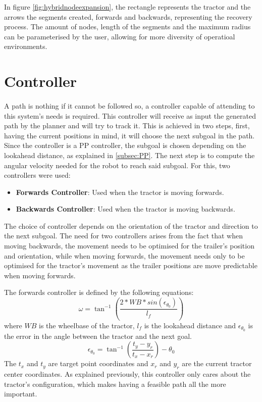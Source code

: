 In figure \ref{fig:hybridnodeexpansion}, the rectangle represents the tractor and the 
arrows the segments created, forwards and backwards, representing the recovery process. 
The amount of nodes, length of the segments and the maximum radius can be parameterised by the user, 
allowing for more diversity of operatioal environments.

\section{Controller}
\label{sec:controller}
\paragraph{}A path is nothing if it cannot be followed so, a controller capable of 
attending to this system's needs is required. This controller will 
receive as input the generated path by the planner and will try to track it. 
This is achieved in two steps, first, having the current positions in mind, 
it will choose the next subgoal in the path. Since the controller is 
a \gls{PP} controller, the subgoal is chosen depending on the lookahead distance, 
as explained in \ref{subsec:PP}. The next step is to compute the angular velocity needed 
for the robot to reach said subgoal. For this, two controllers were used:
\begin{itemize}
    \item \textbf{Forwards Controller}: Used when the tractor is moving forwards.
    \item \textbf{Backwards Controller}: Used when the tractor is moving backwards.
\end{itemize}
The choice of controller depends on the orientation of the tractor and 
direction to the next subgoal. The need for two controllers arises from 
the fact that when moving backwards, the movement needs to be optimised 
for the trailer's position and orientation, while when moving forwards, 
the movement needs only to be optimised for the tractor's movement as the 
trailer positions are move predictable when moving forwards.

The forwards controller is defined by the following equations:
\begin{equation}
    \omega = \tan^{-1}\left(\frac{2*WB*sin(\epsilon_{\theta_0})}{l_f}\right)
\end{equation}
where $WB$ is the wheelbase of the tractor, $l_f$ is the lookahead distance and 
$\epsilon_{\theta_0}$ is the error in the angle between the tractor and the next goal.
\begin{equation}
    \epsilon_{\theta_0} = \tan^{-1}\left(\frac{t_y - y_r}{t_x - x_r}\right) - \theta_0
\end{equation}
The $t_x$ and $t_y$ are target point coordinates and $x_r$ and $y_r$ are the current tractor center coordinates. 
As explained previously, this controller only cares about the tractor's 
configuration, which makes having a feasible path all the more important.

